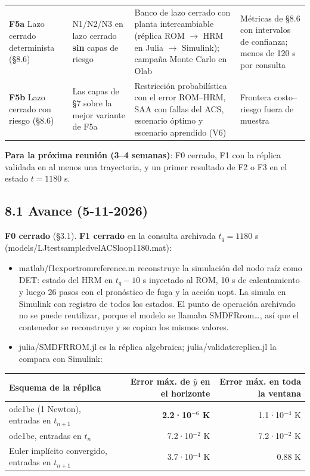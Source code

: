 \documentclass[11pt,a4paper]{article}
\newcommand{\codeus}{\textunderscore\allowbreak}
\newcommand{\code}[1]{{\small\ttfamily\let\_\codeus #1}}
\begin{document}
{\begin{xltabular}{\linewidth}{@{}YYYY@{}}
\textbf{F5a} Lazo cerrado determinista (\S{}8.6) & N1/N2/N3 en lazo cerrado \textbf{sin} capas de riesgo & Banco de lazo cerrado con planta intercambiable (réplica ROM $\to$ HRM en Julia $\to$ Simulink); campaña Monte Carlo en Olab & Métricas de \S{}8.6 con intervalos de confianza; menos de 120 s por consulta \\
\textbf{F5b} Lazo cerrado con riesgo (\S{}8.6) & Las capas de \S{}7 sobre la mejor variante de F5a & Restricción probabilística con el error ROM–HRM, SAA con fallas del ACS, escenario óptimo y escenario aprendido (V6) & Frontera costo–riesgo fuera de muestra \\
\bottomrule
\end{xltabular}}

\textbf{Para la próxima reunión (3–4 semanas)}: F0 cerrado, F1 con la réplica validada en al menos una trayectoria, y un primer resultado de F2 o F3 en el estado $t=1180$ s.

\subsection*{8.1 Avance (5-11-2026)}
\textbf{F0 cerrado} (\S{}3.1). \textbf{F1 cerrado} en la consulta archivada $t_q=1180$ s (\code{models/LJ\_test\_sampled\_vel\_ACS\_2\_loop\_1180.mat}):

\begin{itemize}
\item \code{matlab/f1\_export\_rom\_reference.m} reconstruye la simulación del nodo raíz como \code{DET\_2}: estado del HRM en $t_q-10$ s inyectado al ROM, 10 s de calentamiento y luego 26 pasos con el pronóstico de fuga y la acción \code{u\_opt}. La simula en Simulink con registro de todos los estados. El punto de operación archivado no se puede reutilizar, porque el modelo se llamaba \code{SMDFR\_rom\_…}, así que el contenedor se reconstruye y se copian los mismos valores.
\item \code{julia/SMDFRROM.jl} es la réplica algebraica; \code{julia/validate\_replica.jl} la compara con Simulink:
\end{itemize}

{\small
\begin{xltabular}{\linewidth}{@{}YRR@{}}
\toprule
\textbf{Esquema de la réplica} & \textbf{Error máx. de $\hat y$ en el horizonte} & \textbf{Error máx. en toda la ventana} \\
\midrule
\endhead
\code{ode1be} (1 Newton), entradas en $t_{n+1}$ & \textbf{2.2·10$^{-6}$ K} & 1.1·10$^{-4}$ K \\
\code{ode1be}, entradas en $t_n$ & 7.2·10$^{-2}$ K & 7.2·10$^{-2}$ K \\
Euler implícito convergido, entradas en $t_{n+1}$ & 3.7·10$^{-4}$ K & 0.88 K \\
\bottomrule
\end{xltabular}}
\end{document}
